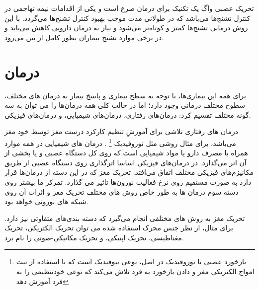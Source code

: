تحریک عصبی واگ
یک تکنیک برای درمان صرع است و یکی از اقدامات نیمه تهاجمی در کنترل تشنج‌ها می‌باشد که در طولانی مدت موجب بهبود کنترل تشنج‌ها می‌گردد. با این روش درمانی تشنج‌ها کمتر و کوتاه‌تر می‌شود و نیاز به درمان دارویی کاهش می‌یابد و در برخی موارد تشنج بیماران بطور کامل از بین می‌رود.


\section{درمان}
برای همه این بیماری‌ها، با توجه به سطح بیماری و پاسخ بیمار به درمان های مختلف، سطوح مختلف درمانی وجود دارد؛ اما در حالت کلی همه درمان‌ها را می توان به سه گونه مختلف تقسیم کرد: درمان‌های رفتاری، درمان‌های شیمیایی، و درمان‌های فیزیکی.


درمان های رفتاری تلاشی برای آموزشِ تنظیم کارکرد درست مغز توسط خود مغز می‌باشد، برای مثال روشی مثل نوروفیدبک
\footnote{بازخورد عصبی یا نوروفیدبک در اصل، نوعی بیوفیدبک است که با استفاده از ثبت امواج الکتریکی مغز و دادن بازخورد به فرد تلاش می‌کند که نوعی خودتنظیمی را به فرد آموزش دهد}
.
درمان های شیمیایی در همه موارد همراه با مصرف دارو یا مواد شیمیایی است که روی کل دستگاه عصبی و یا بخشی از آن اثر می‌گذارد. در درمان‌های فیزیکی اساسا اثرگذاری روی دستگاه عصبی از طریق مکانیزم‌های فیزیکی مختلف اتفاق می‌افتد. تحریک مغز که در این دسته از درمان‌ها قرار دارد به صورت مستقیم روی نرخ فعالیت نورون‌ها تاثیر می گذارد. تمرکز ما بیشتر روی دسته سوم درمان ها  به طور خاص روش های مختلف تحریک مغز و اثرات آن روی شبکه های نورونی خواهد بود.


تحریک مغز به روش های مختلفی انجام می‌گیرد که دسته بندی‌های متفاوتی نیز دارد. برای مثال، از نظر جنس محرک استفاده شده می توان تحریک الکتریکی، تحریک مغناطیسی، تحریک اپتیکی، و تحریک مکانیکی-صوتی را نام برد.
%

